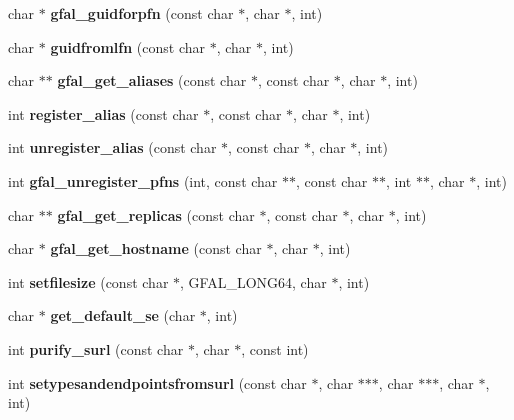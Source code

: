 \begin{DoxyCompactItemize}
\item 
char $\ast$ {\bfseries gfal\_\-guidforpfn} (const char $\ast$, char $\ast$, int)\label{group__internal__group_ga020e615ae95e2b0b8f5c0dc47298b9f0}

\item 
char $\ast$ {\bfseries guidfromlfn} (const char $\ast$, char $\ast$, int)\label{group__internal__group_ga88c4af2de9a99d8b76c3e855021a22ca}

\item 
char $\ast$$\ast$ {\bfseries gfal\_\-get\_\-aliases} (const char $\ast$, const char $\ast$, char $\ast$, int)\label{group__internal__group_gad3906e9adc60918d131c444bbe4b9bfd}

\item 
int {\bfseries register\_\-alias} (const char $\ast$, const char $\ast$, char $\ast$, int)\label{group__internal__group_gaa9f63da8f9c23e4f01e1ad6d432cf6b2}

\item 
int {\bfseries unregister\_\-alias} (const char $\ast$, const char $\ast$, char $\ast$, int)\label{group__internal__group_gab2e43c42a36473c520caffefd941630a}

\item 
int {\bfseries gfal\_\-unregister\_\-pfns} (int, const char $\ast$$\ast$, const char $\ast$$\ast$, int $\ast$$\ast$, char $\ast$, int)\label{group__internal__group_gab9b4c0359f9e47a343e215919ef043d0}

\item 
char $\ast$$\ast$ {\bfseries gfal\_\-get\_\-replicas} (const char $\ast$, const char $\ast$, char $\ast$, int)\label{group__internal__group_ga7c4f1bd90fba32189284d10d6b1f478b}

\item 
char $\ast$ {\bf gfal\_\-get\_\-hostname} (const char $\ast$, char $\ast$, int)
\item 
int {\bfseries setfilesize} (const char $\ast$, GFAL\_\-LONG64, char $\ast$, int)\label{group__internal__group_ga8576799204f1c2bbae03157665d0a01d}

\item 
char $\ast$ {\bfseries get\_\-default\_\-se} (char $\ast$, int)\label{group__internal__group_ga0753853fca065d6e0fb5274139e660dc}

\item 
int {\bfseries purify\_\-surl} (const char $\ast$, char $\ast$, const int)\label{group__internal__group_ga8ad02cb01a7c4b25d7505ff495eaec98}

\item 
int {\bfseries setypesandendpointsfromsurl} (const char $\ast$, char $\ast$$\ast$$\ast$, char $\ast$$\ast$$\ast$, char $\ast$, int)\label{group__internal__group_ga5d65e0a1d965d61576e542f7d5e73801}


\end{DoxyCompactItemize}
